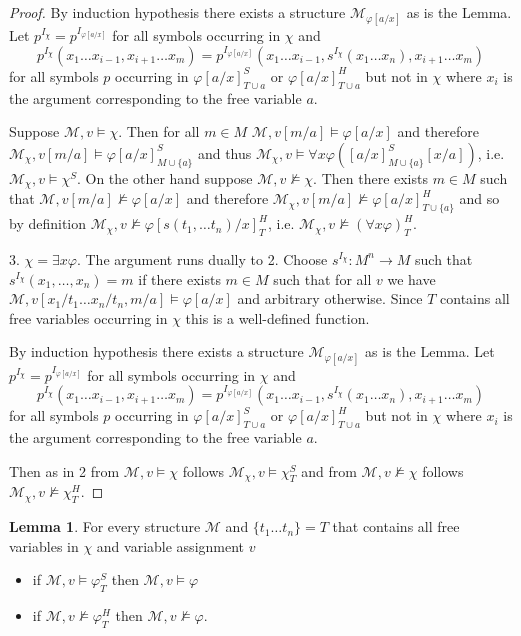 \documentclass[a4paper,12pt]{report}
\theoremstyle{definition}
\theoremstyle{definition}
\theoremstyle{definition}
\newtheorem{lemma}[theorem]{Lemma}
\theoremstyle{definition}
\theoremstyle{definition}
\theoremstyle{definition}
\theoremstyle{definition}
\begin{document}
\begin{proof}
		By induction hypothesis there exists a structure $\mathcal M_{\varphi[a/x]}$ as is the Lemma. Let $p^{I_\chi} = p^{I_{\varphi[a/x]}}$ for all symbols occurring in $\chi$ and $$p^{I_\chi}(x_1\dots x_{i-1}, x_{i+1}\dots x_m) = p^{I_{\varphi[a/x]}}(x_1\dots x_{i-1}, s^{I_\chi}(x_1\dots x_n), x_{i+1}\dots x_m)$$ for all symbols $p$ occurring in $\varphi[a/x]^S_{T\cup a}$ or $\varphi[a/x]^H_{T\cup a}$ but not in $\chi$ where $x_i$ is the argument corresponding to the free variable $a$.
		 
		Suppose $\mathcal M, v\models\chi$. Then for all $m\in M$ $\mathcal M, v[m/a]\models\varphi[a/x]$ and therefore $\mathcal M_{\chi}, v[m/a]\models\varphi[a/x]^S_{M\cup\{a\}}$ and thus $\mathcal M_{\chi}, v\models \forall x\varphi([a/x]^S_{M\cup\{a\}}[x/a])$, i.e. $\mathcal M_\chi,v\models \chi^S$. On the other hand suppose $\mathcal M, v\not\models\chi$. Then there exists $m\in M$ such that $\mathcal M, v[m/a]\not\models\varphi[a/x]$ and therefore $\mathcal M_\chi, v[m/a]\not\models\varphi[a/x]^H_{T\cup\{a\}}$ and so by definition $\mathcal M_\chi, v\not\models\varphi[s(t_1,\dots t_n)/x]^H_T$, i.e. $\mathcal M_\chi, v\not\models(\forall x\varphi)^H_T$.

		3. $\chi = \exists x\varphi$. The argument runs dually to 2. Choose $s^{I_\chi}:M^n\to M$ such that $s^{I_\chi}(x_1,\dots, x_n) = m$ if there exists $m\in M$ such that for all $v$ we have $\mathcal M, v[x_1/t_1\dots x_n/t_n, m/a]\models\varphi[a/x]$ and arbitrary otherwise. Since $T$ contains all free variables occurring in $\chi$ this is a well-defined function.
		
		By induction hypothesis there exists a structure $\mathcal M_{\varphi[a/x]}$ as is the Lemma. Let $p^{I_\chi} = p^{I_{\varphi[a/x]}}$ for all symbols occurring in $\chi$ and $$p^{I_\chi}(x_1\dots x_{i-1}, x_{i+1}\dots x_m) = p^{I_{\varphi[a/x]}}(x_1\dots x_{i-1}, s^{I_\chi}(x_1\dots x_n), x_{i+1}\dots x_m)$$ for all symbols $p$ occurring in $\varphi[a/x]^S_{T\cup a}$ or $\varphi[a/x]^H_{T\cup a}$ but not in $\chi$ where $x_i$ is the argument corresponding to the free variable $a$.
		
		Then as in 2 from $\mathcal M, v\models \chi$ follows $\mathcal M_\chi,v\models\chi^S_T$ and from $\mathcal M, v\not\models \chi$ follows $\mathcal M_\chi,v\not\models\chi^H_T$.
	\end{proof}
	
	\begin{lemma}
		For every structure $\mathcal M$ and $\{t_1\dots t_n\} = T$ that contains all free variables in $\chi$ and variable assignment $v$
		\begin{itemize}
			\item if $\mathcal M, v\models\varphi^S_T$ then $\mathcal M, v\models \varphi$
			\item if $\mathcal M, v\not\models\varphi^H_T$ then $\mathcal M, v\not\models\varphi$.
		\end{itemize}
	\end{lemma}
\end{document}
